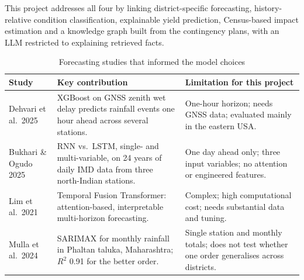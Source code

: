 This project addresses all four by linking district-specific forecasting, history-relative condition classification, explainable yield prediction, Census-based impact estimation and a knowledge graph built from the contingency plans, with an LLM restricted to explaining retrieved facts.

\begin{table}[H]
	\centering
	\caption{Forecasting studies that informed the model choices}
	\label{tab:litgap}
	\small
	\begin{tabularx}{\textwidth}{p{3.6cm}YY}
		\toprule
		\textbf{Study} & \textbf{Key contribution} & \textbf{Limitation for this project} \\
		\midrule
		Dehvari et al.\ 2025 \cite{dehvari2025forecasting} & XGBoost on GNSS zenith wet delay predicts rainfall events one hour ahead across several stations. & One-hour horizon; needs GNSS data; evaluated mainly in the eastern USA. \\
		Bukhari \& Ogudo 2025 \cite{bukhari2025forecasting} & RNN vs.\ LSTM, single- and multi-variable, on 24 years of daily IMD data from three north-Indian stations. & One day ahead only; three input variables; no attention or engineered features. \\
		Lim et al.\ 2021 \cite{lim2021temporal} & Temporal Fusion Transformer: attention-based, interpretable multi-horizon forecasting. & Complex; high computational cost; needs substantial data and tuning. \\
		Mulla et al.\ 2024 \cite{mulla2024sarimax} & SARIMAX for monthly rainfall in Phaltan taluka, Maharashtra; $R^2$ 0.91 for the better order. & Single station and monthly totals; does not test whether one order generalises across districts. \\
		\bottomrule
	\end{tabularx}
\end{table}
